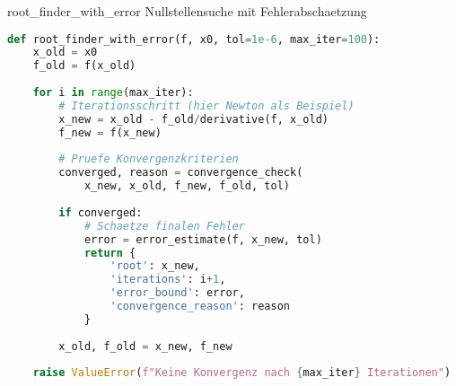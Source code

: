 \begin{examplecode}{root\_finder\_with\_error}
    Nullstellensuche mit Fehlerabschaetzung
\begin{lstlisting}[language=Python, style=basesmol]
def root_finder_with_error(f, x0, tol=1e-6, max_iter=100):
    x_old = x0
    f_old = f(x_old)
    
    for i in range(max_iter):
        # Iterationsschritt (hier Newton als Beispiel)
        x_new = x_old - f_old/derivative(f, x_old)
        f_new = f(x_new)
        
        # Pruefe Konvergenzkriterien
        converged, reason = convergence_check(
            x_new, x_old, f_new, f_old, tol)
            
        if converged:
            # Schaetze finalen Fehler
            error = error_estimate(f, x_new, tol)
            return {
                'root': x_new,
                'iterations': i+1,
                'error_bound': error,
                'convergence_reason': reason
            }
            
        x_old, f_old = x_new, f_new
        
    raise ValueError(f"Keine Konvergenz nach {max_iter} Iterationen")
\end{lstlisting}
\end{examplecode}